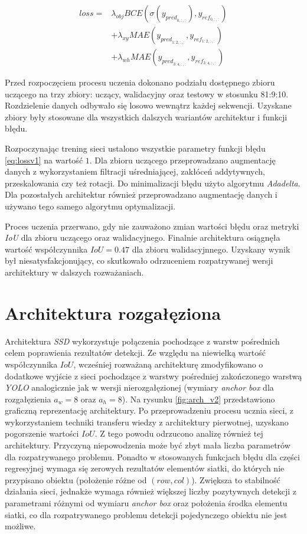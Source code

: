 \begin{equation}
\begin{aligned}
loss =& \lambda_{obj} BCE(\sigma(y_{pred}_{0,:,:}), y_{ref}_{0,:,:}) \\
&+ \lambda_{xy}MAE(y_{pred}_{1:2,:,:}, y_{ref}_{1:2,:,:})\\
&+ \lambda_{wh}MAE(y_{pred}_{3:4,:,:},y_{ref}_{3:4,:,:}) 
\end{aligned}
\label{eq:lossv1}
\end{equation}


Przed rozpoczęciem procesu uczenia dokonano podziału dostępnego zbioru uczącego na trzy zbiory: uczący, walidacyjny oraz testowy w stosunku 81:9:10. 
Rozdzielenie danych odbywało się losowo wewnątrz każdej sekwencji.
Uzyskane zbiory były stosowane dla wszystkich dalszych wariantów architektur i funkcji błędu.

Rozpoczynając trening sieci ustalono wszystkie parametry funkcji błędu \eqref{eq:lossv1} na wartość $1$.
Dla zbioru uczącego przeprowadzano augmentację danych z wykorzystaniem filtracji uśredniającej, zakłóceń addytywnych, przeskalowania czy też rotacji.
Do minimalizacji błędu użyto algorytmu \emph{Adadelta}.
Dla pozostałych architektur również przeprowadzano augmentację danych i używano tego samego algorytmu optymalizacji.

Proces uczenia przerwano, gdy nie zauważono zmian wartości błędu oraz metryki \emph{IoU} dla zbioru uczącego oraz walidacyjnego.
Finalnie architektura osiągnęła wartość współczynnika $IoU = 0.47$ dla zbioru walidacyjnnego.
Uzyskany wynik był niesatysfakcjonujący, co skutkowało odrzuceniem rozpatrywanej wersji architektury w dalszych rozważaniach.

\section{Architektura rozgałęziona}

Architektura \emph{SSD} wykorzystuje połączenia pochodzące z warstw pośrednich celem poprawienia rezultatów detekcji.  
Ze względu na niewielką wartość współczynnika $IoU$, wcześniej rozważaną architekturę zmodyfikowano o  dodatkowe wyjście z sieci pochodzące z warstwy pośredniej zakończonego warstwą \emph{YOLO} analogicznie jak w wersji nierozgałęzionej (wymiary \emph{anchor box} dla rozgałęzienia $a_w = 8$ oraz  $a_h = 8$). 
Na rysunku \ref{fig:arch_v2} przedstawiono graficzną reprezentację architektury. 
Po przeprowadzeniu procesu ucznia sieci, z wykorzystaniem techniki transferu wiedzy z architektury pierwotnej, uzyskano pogorszenie wartości $IoU$.
Z tego powodu odrzucono analizę również tej architektury.
Przyczyną niepowodzenia może być zbyt mała liczba parametrów dla rozpatrywanego problemu.
Ponadto w stosowanych funkcjach błędu dla części regresyjnej wymaga się zerowych rezultatów elementów siatki, do których nie przypisano obiektu (położenie różne od $(row,col)$).
Zwiększa to stabilność działania sieci, jednakże wymaga również większej liczby pozytywnych detekcji z parametrami różnymi od wymiaru \emph{anchor box} oraz położenia środka elementu siatki, co dla rozpatrywanego problemu detekcji pojedynczego obiektu nie jest możliwe. 

